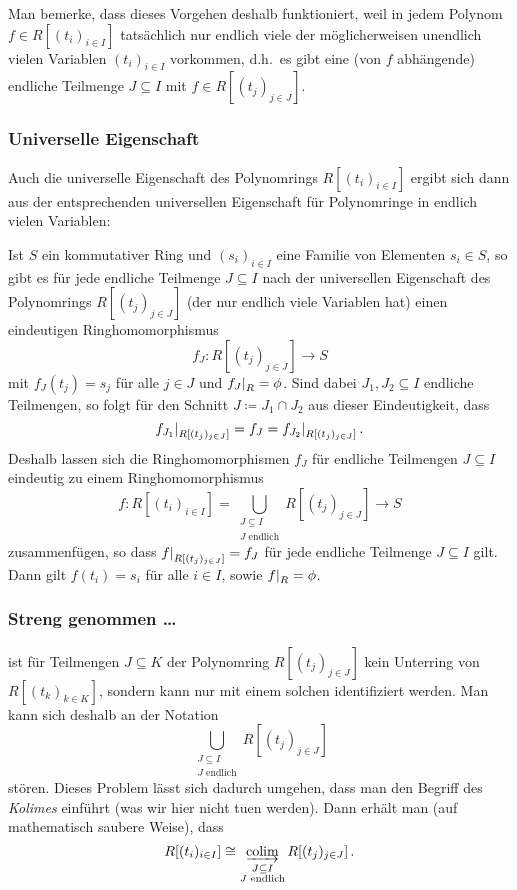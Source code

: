 Man bemerke, dass dieses Vorgehen deshalb funktioniert, weil in jedem Polynom $f \in R[(t_i)_{i \in I}]$ tatsächlich nur endlich viele der möglicherweisen unendlich vielen Variablen $(t_i)_{i \in I}$ vorkommen, d.h.\ es gibt eine (von $f$ abhängende) endliche Teilmenge $J \subseteq I$ mit $f \in R[(t_j)_{j \in J}]$.



\subsubsection*{Universelle Eigenschaft}

Auch die universelle Eigenschaft des Polynomrings $R[(t_i)_{i \in I}]$ ergibt sich dann aus der entsprechenden universellen Eigenschaft für Polynomringe in endlich vielen Variablen:

Ist $S$ ein kommutativer Ring und $(s_i)_{i \in I}$ eine Familie von Elementen $s_i \in S$, so gibt es für jede endliche Teilmenge $J \subseteq I$ nach der universellen Eigenschaft des Polynomrings $R[(t_j)_{j \in J}]$ (der nur endlich viele Variablen hat) einen eindeutigen Ringhomomorphismus
\[
          f_J
  \colon  R[(t_j)_{j \in J}]
  \to     S
\]
mit $f_J(t_j) = s_j$ für alle $j \in J$ und $\restrict{f_J}{R} = \phi$.
Sind dabei $J_1, J_2 \subseteq I$ endliche Teilmengen, so folgt für den Schnitt $J \coloneqq J_1 \cap J_2$ aus dieser Eindeutigkeit, dass
\[
    \restrict{ f_{J_1} }{R[(t_j)_{j \in J}]}
  = f_{J}
  = \restrict{ f_{J_2} }{R[(t_j)_{j \in J}]} \,.
\]
Deshalb lassen sich die Ringhomomorphismen $f_J$ für endliche Teilmengen $J \subseteq I$ eindeutig zu einem Ringhomomorphismus
\[
          f
  \colon  R[(t_i)_{i \in I}]
  =       \bigcup_{\substack{J \subseteq I \\ \text{$J$ endlich}}} R[(t_j)_{j \in J}]
  \to     S
\]
zusammenfügen, so dass $\restrict{f}{R[(t_j)_{j \in J}]} = f_J$ für jede endliche Teilmenge $J \subseteq I$ gilt.
Dann gilt $f(t_i) = s_i$ für alle $i \in I$, sowie $\restrict{f}{R} = \phi$.



\subsubsection*{Streng genommen \dots}

ist für Teilmengen $J \subseteq K$ der Polynomring $R[(t_j)_{j \in J}]$ kein Unterring von $R[(t_k)_{k \in K}]$, sondern kann nur mit einem solchen identifiziert werden.
Man kann sich deshalb an der Notation
\[
  \bigcup_{\substack{J \subseteq I \\ \text{$J$ endlich}}} R[(t_j)_{j \in J}]
\]
stören.
Dieses Problem lässt sich dadurch umgehen, dass man den Begriff des \emph{Kolimes} einführt (was wir hier nicht tuen werden).
Dann erhält man (auf mathematisch saubere Weise), dass
\[
        R[(t_i)_{i \in I}]
  \cong \colim_{\substack{J \subseteq I \\ \text{$J$ endlich}}} R[(t_j)_{j \in J}] \,.
\]





